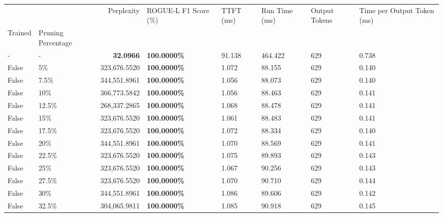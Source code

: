 \begin{table}[H]
\centering
\label{tab:evaluation-pipeline-1-untrained}
\begin{tabular}{|m{}| m{}| r | R{0.13\textwidth}| R{0.09\textwidth}| R{0.09\textwidth}| R{0.09\textwidth}| R{0.11\textwidth}|} %
\toprule
 &  & Perplexity & ROGUE-L F1 Score (\%) & TTFT (ms) & Run Time (ms) & Output Tokens & Time per Output Token (ms) \\
Trained & Pruning Percentage &  &  &  &  &  &  \\
\midrule
- & - & \bfseries 32.0966 & \bfseries 100.0000\% & 91.138 & 464.422 & 629 & 0.738 \\
 
False & 5\% & 323,676.5520 & \bfseries \color{red} 100.0000\% & 1.072 & 88.155 & 629 & 0.140 \\
 
False & 7.5\% & 344,551.8961 & \bfseries \color{red} 100.0000\% & 1.056 & 88.073 & 629 & 0.140 \\
 
False & 10\% & 366,773.5842 & \bfseries \color{red} 100.0000\% & 1.056 & 88.463 & 629 & 0.141 \\
 
False & 12.5\% & \color{red} 268,337.2865 & \bfseries \color{red} 100.0000\% & 1.068 & 88.478 & 629 & 0.141 \\
 
False & 15\% & 323,676.5520 & \bfseries \color{red} 100.0000\% & 1.061 & 88.483 & 629 & 0.141 \\
 
False & 17.5\% & 323,676.5520 & \bfseries \color{red} 100.0000\% & 1.072 & 88.334 & 629 & 0.140 \\
 
False & 20\% & 344,551.8961 & \bfseries \color{red} 100.0000\% & 1.070 & 88.569 & 629 & 0.141 \\
 
False & 22.5\% & 323,676.5520 & \bfseries \color{red} 100.0000\% & 1.075 & 89.893 & 629 & 0.143 \\
 
False & 25\% & 323,676.5520 & \bfseries \color{red} 100.0000\% & 1.067 & 90.256 & 629 & 0.143 \\
 
False & 27.5\% & 323,676.5520 & \bfseries \color{red} 100.0000\% & 1.070 & 90.710 & 629 & 0.144 \\
 
False & 30\% & 344,551.8961 & \bfseries \color{red} 100.0000\% & 1.086 & 89.606 & 629 & 0.142 \\
 
False & 32.5\% & 304,065.9811 & \bfseries \color{red} 100.0000\% & 1.085 & 90.918 & 629 & 0.145 \\

\end{tabular}
\end{table}
